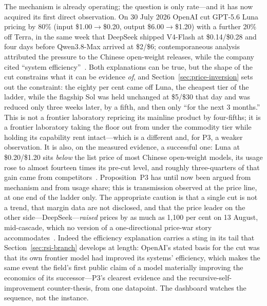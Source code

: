 The mechanism is already operating; the question is only rate---and it has now acquired its first direct observation. On 30 July 2026 OpenAI cut GPT-5.6 Luna pricing by 80\% (input \$1.00$\to$\$0.20, output \$6.00$\to$\$1.20) with a further 20\% off Terra, in the same week that DeepSeek shipped V4-Flash at \$0.14/\$0.28 and four days before Qwen3.8-Max arrived at \$2/\$6; contemporaneous analysis attributed the pressure to the Chinese open-weight releases, while the company cited ``system efficiency''~\cite{openai-cut,openai-luna}. Both explanations can be true, but the shape of the cut constrains what it can be evidence \emph{of}, and Section~\ref{sec:price-inversion} sets out the constraint: the eighty per cent came off Luna, the cheapest tier of the ladder, while the flagship Sol was held unchanged at \$5/\$30 that day and was reduced only three weeks later, by a fifth, and then only ``for the next 3 months.'' This is not a frontier laboratory repricing its mainline product by four-fifths; it is a frontier laboratory taking the floor out from under the commodity tier while holding its capability rent intact---which is a different and, for P3, a weaker observation. It is also, on the measured evidence, a successful one: Luna at \$0.20/\$1.20 sits \emph{below} the list price of most Chinese open-weight models, its usage rose to almost fourteen times its pre-cut level, and roughly three-quarters of that gain came from competitors~\cite{price-inversion}. Proposition~P3 has until now been argued from mechanism and from usage share; this is transmission observed at the price line, at one end of the ladder only. The appropriate caution is that a single cut is not a trend, that margin data are not disclosed, and that the price leader on the other side---DeepSeek---\emph{raised} prices by as much as 1{,}100 per cent on 13 August, mid-cascade, which no version of a one-directional price-war story accommodates~\cite{deepseek-raise}. Indeed the efficiency explanation carries a sting in its tail that Section~\ref{sec:rsi-branch} develops at length: OpenAI's stated basis for the cut was that its own frontier model had improved its systems' efficiency, which makes the same event the field's first public claim of a model materially improving the economics of its successor---P3's clearest evidence and the recursive-self-improvement counter-thesis, from one datapoint. The dashboard watches the sequence, not the instance.

